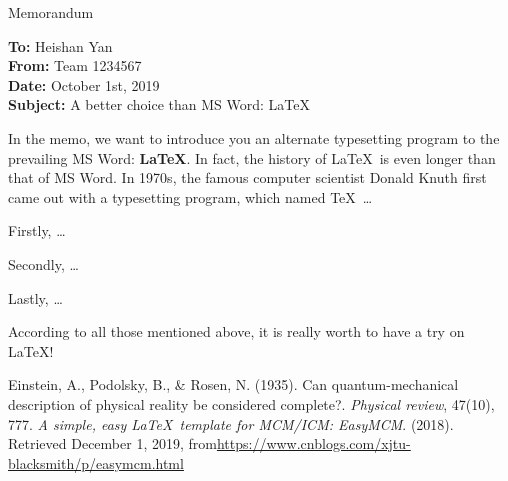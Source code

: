 \documentclass[12pt]{article}  %
\begin{document}
	
	\begin{letter}{Memorandum}
		\begin{flushleft}  %
			\textbf{To:} Heishan Yan\\
			\textbf{From:} Team 1234567\\
			\textbf{Date:} October 1st, 2019\\
			\textbf{Subject:} A better choice than MS Word: \LaTeX
		\end{flushleft}
		
		In the memo, we want to introduce you an alternate typesetting program to the prevailing MS Word: \textbf{\LaTeX}. In fact, the history of \LaTeX\ is even longer than that of MS Word. In 1970s, the famous computer scientist Donald Knuth first came out with a typesetting program, which named \TeX\ \ldots
		
		Firstly, \ldots
		
		Secondly, \ldots
		
		Lastly, \ldots
		
		According to all those mentioned above, it is really worth to have a try on \LaTeX! 
	\end{letter}
	
	
	\begin{thebibliography}{99}
		 Einstein, A., Podolsky, B., \& Rosen, N. (1935). Can quantum-mechanical description of physical reality be considered complete?. \emph{Physical review}, 47(10), 777.
		 \emph{A simple, easy \LaTeX\ template for MCM/ICM: EasyMCM}. (2018). Retrieved December 1, 2019, from\url{https://www.cnblogs.com/xjtu-blacksmith/p/easymcm.html}
	\end{thebibliography}
	
\end{document}
